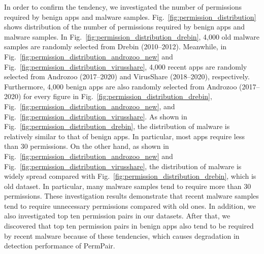 \documentclass{ieeeaccess}
\newcommand{\myfigurename}{Fig.}
\begin{document}
In order to confirm the tendency, we investigated the number of permissions required by benign apps and malware samples.
\myfigurename~\ref{fig:permission_distribution} shows distribution of the number of permissions required by benign apps and malware samples.
In \myfigurename~\ref{fig:permission_distribution_drebin}, 4,000 old malware samples are randomly selected from Drebin \cite{arp2014drebin} (2010--2012).
Meanwhile, in \myfigurename~\ref{fig:permission_distribution_androzoo_new} and \myfigurename~\ref{fig:permission_distribution_virusshare}, 4,000 recent apps are randomly selected from Androzoo \cite{allix2016androzoo} (2017--2020) and VirusShare \cite{virusshare} (2018--2020), respectively.
Furthermore, 4,000 benign apps are also randomly selected from Androzoo (2017--2020) for every figure in \myfigurename~\ref{fig:permission_distribution_drebin}, \myfigurename~\ref{fig:permission_distribution_androzoo_new}, and \myfigurename~\ref{fig:permission_distribution_virusshare}.
As shown in \myfigurename~\ref{fig:permission_distribution_drebin}, the distribution of malware is relatively similar to that of benign apps.  
In particular, most apps require less than 30 permissions. 
On the other hand, as shown in \myfigurename~\ref{fig:permission_distribution_androzoo_new} and \myfigurename~\ref{fig:permission_distribution_virusshare}, the distribution of malware is widely spread compared with \myfigurename~\ref{fig:permission_distribution_drebin}, which is old dataset.
In particular, many malware samples tend to require more than 30 permissions.
These investigation results demonstrate that recent malware samples tend to require unnecessary permissions compared with old ones.
In addition, we also investigated top ten permission pairs in our datasets.
After that, we discovered that top ten permission pairs in benign apps also tend to be required by recent malware because of these tendencies, which causes degradation in detection performance of PermPair.  
\end{document}
